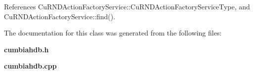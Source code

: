 References Cu\+R\+N\+D\+Action\+Factory\+Service\+::\+Cu\+R\+N\+D\+Action\+Factory\+Service\+Type, and Cu\+R\+N\+D\+Action\+Factory\+Service\+::find().



The documentation for this class was generated from the following files\+:\begin{DoxyCompactItemize}
\item 
\textbf{ cumbiahdb.\+h}\item 
\textbf{ cumbiahdb.\+cpp}\end{DoxyCompactItemize}
